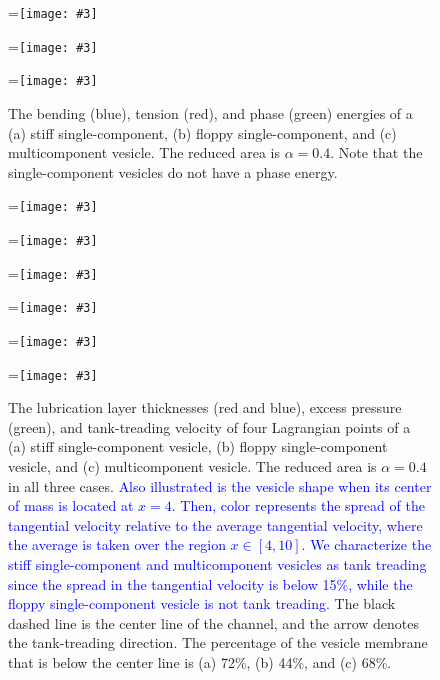 \documentclass[twoside,twocolumn,9pt]{article}
\newcommand{\subfigimg}[3][,]{%
  \setbox1=\hbox{\texttt{[image: \#3]}}%
  \leavevmode\rlap{\usebox1}%
  \rlap{\hspace*{0pt}\raisebox{\dimexpr\ht1-0\baselineskip}{\bf
  \normalsize #2}}%
  \phantom{\usebox1}%
}
\begin{document}
\begin{figure}[ht]
  \centering
  \subfigimg[width=0.3\linewidth]{(a)}{figures/SC_energy.pdf}
  \subfigimg[width=0.3\linewidth]{(b)}{figures/SCp55_energy.pdf}
  \subfigimg[width=0.3\linewidth]{(c)}{figures/MCp5_energy.pdf}
  \caption{\label{fig:Energy} \small The bending (blue), tension (red),
  and phase (green) energies of a (a) stiff single-component, (b)
  floppy single-component, and (c) multicomponent vesicle. The reduced
  area is $\alpha = 0.4$. Note that the single-component vesicles do not
  have a phase energy.} 
\end{figure}
\begin{figure}[ht]
  \centering
  \subfigimg[width=0.3\linewidth]{(a)}{figures/Layer_Size_RAp4_SC.pdf}
  \subfigimg[width=0.3\linewidth]{(b)}{figures/Layer_Size_RAp4_SCp55.pdf}
  \subfigimg[width=0.3\linewidth]{(c)}{figures/Layer_Size_RAp4_MCp5.pdf}
  \subfigimg[width=0.3\linewidth,trim=4cm 20cm 33cm 7cm,clip=true]{}
    {figures/SC_treading_velocity2.pdf}
  \subfigimg[width=0.3\linewidth,trim=4cm 20cm 33cm 7cm,clip=true]{}
    {figures/SCp55_treading_velocity2.pdf}
  \subfigimg[width=0.3\linewidth,trim=4cm 20cm 33cm 7cm,clip=true]{}
    {figures/MCp5_treading_velocity2.pdf}
  \caption{\label{fig:lubricationComposite} \small The lubrication layer
  thicknesses (red and blue), excess pressure (green), and
  tank-treading velocity of four Lagrangian points of a (a) stiff
  single-component vesicle, (b) floppy single-component vesicle, and (c)
  multicomponent vesicle. The reduced area is $\alpha = 0.4$ in all
  three cases. 
  \textcolor{blue}{
  Also illustrated is the vesicle shape when its center of mass is
  located at $x=4$. Then, color represents the spread of the tangential
  velocity relative to the average tangential velocity, where the average
  is taken over the region $x \in [4,10]$. We characterize the stiff
  single-component and multicomponent vesicles as tank treading since
  the spread in the tangential velocity is below 15\%, while the floppy
  single-component vesicle is not tank treading.
  }
  The black dashed line is the center line of the channel, and the arrow
  denotes the tank-treading direction. The percentage of the vesicle
  membrane that is below the center line is (a) 72\%, (b) 44\%, and (c)
  68\%.}
\end{figure}
\end{document}
